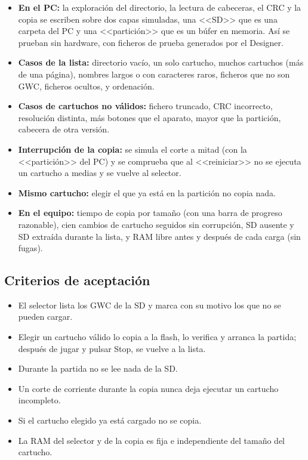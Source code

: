 \begin{itemize}
	\item \textbf{En el PC:} la exploración del directorio, la lectura de cabeceras, el CRC y la copia se escriben sobre dos capas simuladas, una <<SD>> que es una carpeta del PC y una <<partición>> que es un búfer en memoria. Así se prueban sin hardware, con ficheros de prueba generados por el Designer.
	\item \textbf{Casos de la lista:} directorio vacío, un solo cartucho, muchos cartuchos (más de una página), nombres largos o con caracteres raros, ficheros que no son GWC, ficheros ocultos, y ordenación.
	\item \textbf{Casos de cartuchos no válidos:} fichero truncado, CRC incorrecto, resolución distinta, más botones que el aparato, mayor que la partición, cabecera de otra versión.
	\item \textbf{Interrupción de la copia:} se simula el corte a mitad (con la <<partición>> del PC) y se comprueba que al <<reiniciar>> no se ejecuta un cartucho a medias y se vuelve al selector.
	\item \textbf{Mismo cartucho:} elegir el que ya está en la partición no copia nada.
	\item \textbf{En el equipo:} tiempo de copia por tamaño (con una barra de progreso razonable), cien cambios de cartucho seguidos sin corrupción, SD ausente y SD extraída durante la lista, y RAM libre antes y después de cada carga (sin fugas).
\end{itemize}

\subsection{Criterios de aceptación}
\label{sec:F7I01Criterios}

\begin{itemize}
	\item El selector lista los GWC de la SD y marca con su motivo los que no se pueden cargar.
	\item Elegir un cartucho válido lo copia a la flash, lo verifica y arranca la partida; después de jugar y pulsar Stop, se vuelve a la lista.
	\item Durante la partida no se lee nada de la SD.
	\item Un corte de corriente durante la copia nunca deja ejecutar un cartucho incompleto.
	\item Si el cartucho elegido ya está cargado no se copia.
	\item La RAM del selector y de la copia es fija e independiente del tamaño del cartucho.
\end{itemize}

